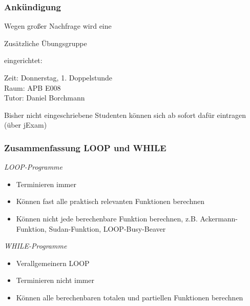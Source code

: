 \documentclass[onlymath]{beamer}
\begin{document}
\maketitle

\begin{frame}\frametitle{Ankündigung}

Wegen großer Nachfrage wird eine

\begin{center}
{\huge Zusätzliche Übungsgruppe}
\end{center}

eingerichtet:\bigskip

\alert{Zeit:} Donnerstag, 1. Doppelstunde\\
\alert{Raum:} APB E008\\
\alert{Tutor:} Daniel Borchmann
\bigskip

Bisher nicht eingeschriebene Studenten können sich ab sofort dafür eintragen (über jExam)

\end{frame}



\begin{frame}\frametitle{Zusammenfassung LOOP und WHILE}

\emph{LOOP-Programme}
\begin{itemize}
\item Terminieren immer
\item Können fast alle praktisch relevanten Funktionen berechnen
\item Können nicht jede berechenbare Funktion berechnen, z.B. Ackermann-Funktion, Sudan-Funktion, LOOP-Busy-Beaver
\end{itemize}
\bigskip

\emph{WHILE-Programme}
\begin{itemize}
\item Verallgemeinern LOOP
\item Terminieren nicht immer
\item Können alle berechenbaren totalen und partiellen Funktionen berechnen
\end{itemize}

\end{frame}
\end{document}
